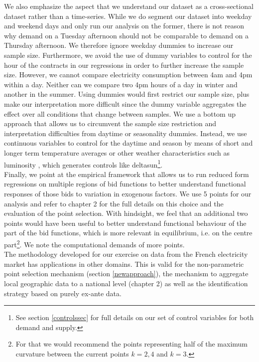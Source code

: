 We also emphasize the aspect that we understand our dataset as a cross-sectional dataset rather than a time-series. 
\label{nodummies}
While we do segment our dataset into weekday and weekend days and only run our analysis on the former, there is not reason why demand on a Tuesday afternoon should not be comparable to demand on a Thursday afternoon. We therefore ignore weekday dummies to increase our sample size. 
Furthermore, we avoid the use of dummy variables to control for the hour of the contracts in our regressions in order to further increase the sample size. However, we cannot compare electricity consumption between 4am and 4pm within a day. Neither can we compare two 4pm hours of a day in winter and another in the summer. Using dummies would first restrict our sample size, plus make our interpretation more difficult since the dummy variable aggregates the effect over all conditions that change between samples. We use a bottom up approach that allows us to circumvent the sample size restriction and interpretation difficulties from daytime or seasonality dummies. Instead, we use continuous variables to control for the daytime and season by means of short and longer term temperature averages or other weather characteristics such as luminosity , which generates controls like deltasun\footnote{See section \ref{controlssec} for full details on our set of control variables for both demand and supply.}. \\

Finally, we point at the empirical framework that allows us to run reduced form regressions on multiple regions of bid functions to better understand functional responses of those bids to variation in exogenous factors. We use 5 points for our analysis and refer to chapter 2 for the full details on this choice and the evaluation of the point selection. With hindsight, we feel that an additional two points would have been useful to better understand functional behaviour of the part of the bid functions, which is more relevant in equilibrium, i.e. on the centre part\footnote{For that we would recommend the points representing half of the maximum curvature between the current points $k=2,4$ and $k=3$.}. 
We note the computational demands of more points. \\

\label{externalvalidity}
The methodology developed for our exercise on data from the French electricity market has applications in other domains. This is valid for the non-parametric point selection mechanism (section \ref{newapproach}), the mechanism to aggregate local geographic data to a national level (chapter 2) as well as the identification strategy based on purely ex-ante data. \\

